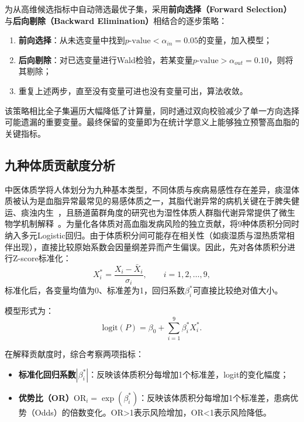 \documentclass[a4paper,12pt]{ctexart}
\begin{document}
为从高维候选指标中自动筛选最优子集，采用\textbf{前向选择（Forward Selection）}与\textbf{后向剔除（Backward Elimination）}相结合的逐步策略：
\begin{enumerate}
    \item \textbf{前向选择}：从未选变量中找到$p\text{-value}<\alpha_{in}=0.05$的变量，加入模型；
    \item \textbf{后向剔除}：对已选变量进行Wald检验，若某变量$p\text{-value}>\alpha_{out}=0.10$，则将其剔除；
    \item 重复上述两步，直至没有变量可进也没有变量可出，算法收敛。
\end{enumerate}

该策略相比全子集遍历大幅降低了计算量，同时通过双向校验减少了单一方向选择可能遗漏的重要变量。最终保留的变量即为在统计学意义上能够独立预警高血脂的关键指标。

\subsection{九种体质贡献度分析}
中医体质学将人体划分为九种基本类型，不同体质与疾病易感性存在差异，痰湿体质被认为是血脂异常最常见的易感体质之一，其脂代谢异常的病机关键在于脾失健运、痰浊内生~\cite{jin2026tcm}，且肠道菌群角度的研究也为湿性体质人群脂代谢异常提供了微生物学机制解释~\cite{zhang2025gut}。为量化各体质对高血脂发病风险的独立贡献，将9种体质积分同时纳入多元Logistic回归。由于体质积分间可能存在相关性（如痰湿质与湿热质常相伴出现），直接比较原始系数会因量纲差异而产生偏误。因此，先对各体质积分进行Z-score标准化：
\begin{equation}
X_i^* = \frac{X_i-\bar{X}_i}{\sigma_i}, \qquad i=1,2,\dots,9,
\end{equation}
标准化后，各变量均值为0、标准差为1，回归系数$\beta_i^*$可直接比较绝对值大小。

模型形式为：
\begin{equation}
\text{logit}(P) = \beta_0 + \sum_{i=1}^{9}\beta_i^* X_i^*.
\end{equation}

在解释贡献度时，综合考察两项指标：
\begin{itemize}
    \item \textbf{标准化回归系数}$|\beta_i^*|$：反映该体质积分每增加1个标准差，logit的变化幅度；
    \item \textbf{优势比（OR）}$\text{OR}_i=\exp(\beta_i^*)$：反映该体质积分每增加1个标准差，患病优势（Odds）的倍数变化。OR>1表示风险增加，OR<1表示风险降低。
\end{itemize}
\end{document}
